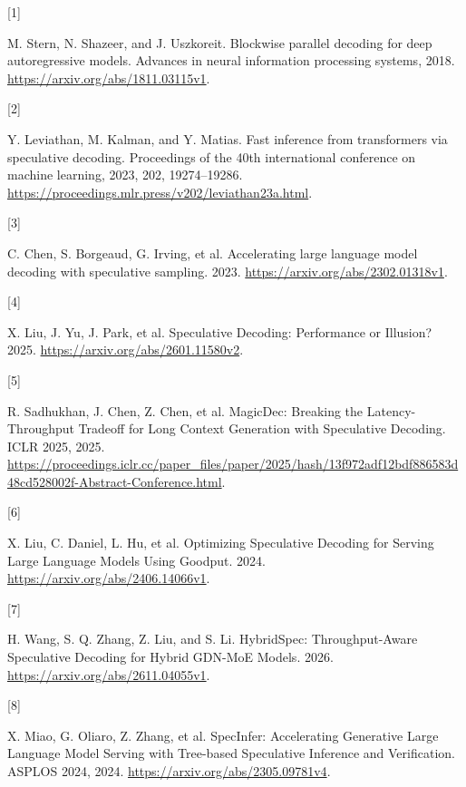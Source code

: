 \documentclass[
  a4paper,
  UTF8,
  fontset=none,
  zihao=5]{ctexart}
\newlength{\cslhangindent}
\newlength{\csllabelwidth}
\newenvironment{CSLReferences}[2] %
 {\begin{list}{}{%
  \setlength{\itemindent}{0pt}
  \setlength{\leftmargin}{0pt}
  \setlength{\parsep}{0pt}
  \ifodd #1
   \setlength{\leftmargin}{\cslhangindent}
   \setlength{\itemindent}{-1\cslhangindent}
  \fi
  \setlength{\itemsep}{#2\baselineskip}}}
 {\end{list}}
\newcommand{\CSLLeftMargin}[1]{\parbox[t]{\csllabelwidth}{\strut#1\strut}}
\newcommand{\CSLRightInline}[1]{\parbox[t]{\linewidth - \csllabelwidth}{\strut#1\strut}}
\begin{document}
\label{refs}
\begin{CSLReferences}{0}{0}
\CSLLeftMargin{{[}1{]} }%
\CSLRightInline{M. Stern, N. Shazeer, and J. Uszkoreit. Blockwise
parallel decoding for deep autoregressive models. Advances in neural
information processing systems, 2018.
\url{https://arxiv.org/abs/1811.03115v1}.}

\CSLLeftMargin{{[}2{]} }%
\CSLRightInline{Y. Leviathan, M. Kalman, and Y. Matias. Fast inference
from transformers via speculative decoding. Proceedings of the 40th
international conference on machine learning, 2023, 202, 19274--19286.
\url{https://proceedings.mlr.press/v202/leviathan23a.html}.}

\CSLLeftMargin{{[}3{]} }%
\CSLRightInline{C. Chen, S. Borgeaud, G. Irving, et al. Accelerating
large language model decoding with speculative sampling. 2023.
\url{https://arxiv.org/abs/2302.01318v1}.}

\CSLLeftMargin{{[}4{]} }%
\CSLRightInline{X. Liu, J. Yu, J. Park, et al. {Speculative Decoding:
Performance or Illusion?} 2025.
\url{https://arxiv.org/abs/2601.11580v2}.}

\CSLLeftMargin{{[}5{]} }%
\CSLRightInline{R. Sadhukhan, J. Chen, Z. Chen, et al. {MagicDec:
Breaking the Latency-Throughput Tradeoff for Long Context Generation
with Speculative Decoding}. ICLR 2025, 2025.
\url{https://proceedings.iclr.cc/paper_files/paper/2025/hash/13f972adf12bdf886583d48cd528002f-Abstract-Conference.html}.}

\CSLLeftMargin{{[}6{]} }%
\CSLRightInline{X. Liu, C. Daniel, L. Hu, et al. {Optimizing Speculative
Decoding for Serving Large Language Models Using Goodput}. 2024.
\url{https://arxiv.org/abs/2406.14066v1}.}

\CSLLeftMargin{{[}7{]} }%
\CSLRightInline{H. Wang, S. Q. Zhang, Z. Liu, and S. Li. {HybridSpec:
Throughput-Aware Speculative Decoding for Hybrid GDN-MoE Models}. 2026.
\url{https://arxiv.org/abs/2611.04055v1}.}

\CSLLeftMargin{{[}8{]} }%
\CSLRightInline{X. Miao, G. Oliaro, Z. Zhang, et al. {SpecInfer:
Accelerating Generative Large Language Model Serving with Tree-based
Speculative Inference and Verification}. ASPLOS 2024, 2024.
\url{https://arxiv.org/abs/2305.09781v4}.}


\end{CSLReferences}
\end{document}
